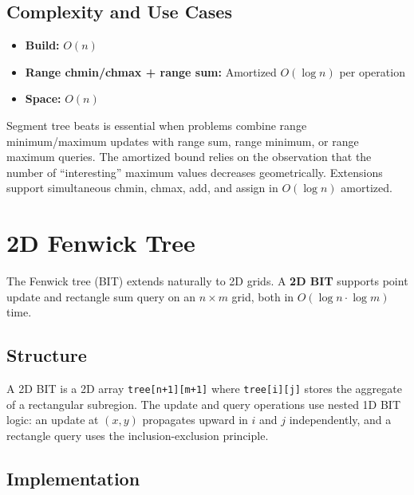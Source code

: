 \subsection{Complexity and Use Cases}

\begin{itemize}
\item \textbf{Build:} $O(n)$
\item \textbf{Range chmin/chmax + range sum:} Amortized $O(\log n)$ per operation
\item \textbf{Space:} $O(n)$
\end{itemize}

Segment tree beats is essential when problems combine range minimum/maximum updates with range sum, range minimum, or range maximum queries. The amortized bound relies on the observation that the number of ``interesting'' maximum values decreases geometrically. Extensions support simultaneous chmin, chmax, add, and assign in $O(\log n)$ amortized.

\section{2D Fenwick Tree}

The Fenwick tree (BIT) extends naturally to 2D grids. A \textbf{2D BIT} supports point update and rectangle sum query on an $n \times m$ grid, both in $O(\log n \cdot \log m)$ time.

\subsection{Structure}

A 2D BIT is a 2D array \texttt{tree[n+1][m+1]} where \texttt{tree[i][j]} stores the aggregate of a rectangular subregion. The update and query operations use nested 1D BIT logic: an update at $(x, y)$ propagates upward in $i$ and $j$ independently, and a rectangle query uses the inclusion-exclusion principle.

\subsection{Implementation}

